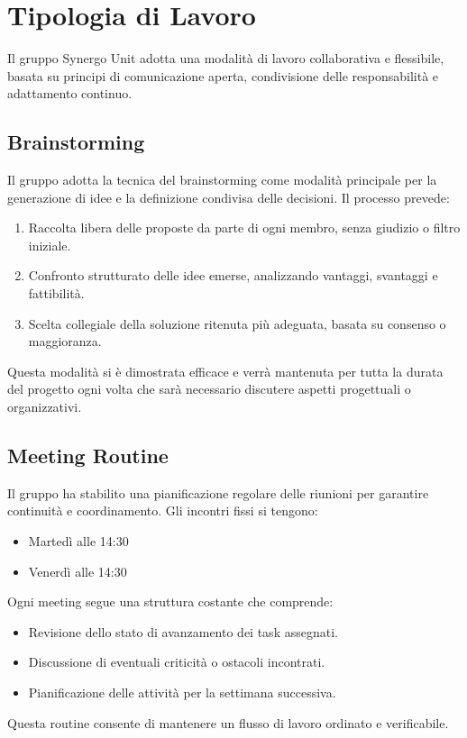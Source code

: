 \section{Tipologia di Lavoro}
Il gruppo Synergo Unit adotta una modalità di lavoro collaborativa e flessibile,
basata su principi di comunicazione aperta, condivisione delle responsabilità e adattamento continuo.


\subsection{Brainstorming}
Il gruppo adotta la tecnica del brainstorming come modalità principale per la generazione di idee e la definizione condivisa delle decisioni.
Il processo prevede:
\begin{enumerate}
    \item Raccolta libera delle proposte da parte di ogni membro, senza giudizio o filtro iniziale.
    \item Confronto strutturato delle idee emerse, analizzando vantaggi, svantaggi e fattibilità.
    \item Scelta collegiale della soluzione ritenuta più adeguata, basata su consenso o maggioranza.
\end{enumerate}
Questa modalità si è dimostrata efficace e verrà mantenuta per tutta la durata del progetto
ogni volta che sarà necessario discutere aspetti progettuali o organizzativi.


\subsection{Meeting Routine}
Il gruppo ha stabilito una pianificazione regolare delle riunioni per garantire continuità e coordinamento.
Gli incontri fissi si tengono:
\begin{itemize}
    \item Martedì alle 14:30
    \item Venerdì alle 14:30
\end{itemize}
Ogni meeting segue una struttura costante che comprende:
\begin{itemize}
    \item Revisione dello stato di avanzamento dei task assegnati.
    \item Discussione di eventuali criticità o ostacoli incontrati.
    \item Pianificazione delle attività per la settimana successiva.
\end{itemize}
Questa routine consente di mantenere un flusso di lavoro ordinato e verificabile.
